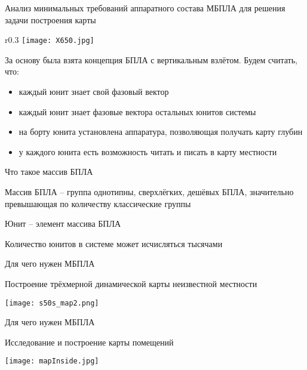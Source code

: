 \begin{tslide}{Анализ минимальных требований аппаратного состава
МБПЛА для решения задачи построения карты}

    \begin{wrapfigure}{r}{0.3\textwidth}
        \vspace{-1cm}
        \texttt{[image: X650.jpg]}
        \vspace{-2.8cm}
    \end{wrapfigure}

    За основу была взята концепция БПЛА с вертикальным взлётом.
    Будем считать, что:
    \begin{itemize}
    \item каждый юнит знает свой фазовый вектор
    \item каждый юнит знает фазовые вектора остальных юнитов системы
    \item на борту юнита установлена аппаратура, позволяющая получать карту глубин
    \item у каждого юнита есть возможность читать и писать в карту местности
    \end{itemize}

\end{tslide}

\begin{tslide}{Что такое массив БПЛА}

    Массив БПЛА -- группа однотипны, сверхлёгких, дешёвых БПЛА,
    значительно превышающая по количеству классические группы

    Юнит -- элемент массива БПЛА

    Количество юнитов в системе может исчисляться тысячами
\end{tslide}

\begin{tslide}{Для чего нужен МБПЛА}

    Построение трёхмерной динамической \newline
        карты неизвестной местности

    \vfill
    \begin{center}
    \texttt{[image: s50s\_map2.png]}
    \end{center}
    \vfill
\end{tslide}

\begin{tslide}{Для чего нужен МБПЛА}

    Исследование и построение карты помещений
    \vfill

    \begin{center}
    \texttt{[image: mapInside.jpg]}
    \end{center}
    \vfill

\end{tslide}

